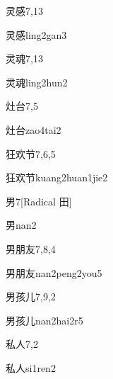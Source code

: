 \begin{entry}{灵感}{7,13}
  \begin{phonetics}{灵感}{ling2gan3}
  \end{phonetics}
\end{entry}

\begin{entry}{灵魂}{7,13}
  \begin{phonetics}{灵魂}{ling2hun2}
  \end{phonetics}
\end{entry}

\begin{entry}{灶台}{7,5}
  \begin{phonetics}{灶台}{zao4tai2}
  \end{phonetics}
\end{entry}

\begin{entry}{狂欢节}{7,6,5}
  \begin{phonetics}{狂欢节}{kuang2huan1jie2}
  \end{phonetics}
\end{entry}

\begin{entry}{男}{7}[Radical 田]
  \begin{phonetics}{男}{nan2}
  \end{phonetics}
\end{entry}

\begin{entry}{男朋友}{7,8,4}
  \begin{phonetics}{男朋友}{nan2peng2you5}
  \end{phonetics}
\end{entry}

\begin{entry}{男孩儿}{7,9,2}
  \begin{phonetics}{男孩儿}{nan2hai2r5}
  \end{phonetics}
\end{entry}

\begin{entry}{私人}{7,2}
  \begin{phonetics}{私人}{si1ren2}
  \end{phonetics}
\end{entry}

